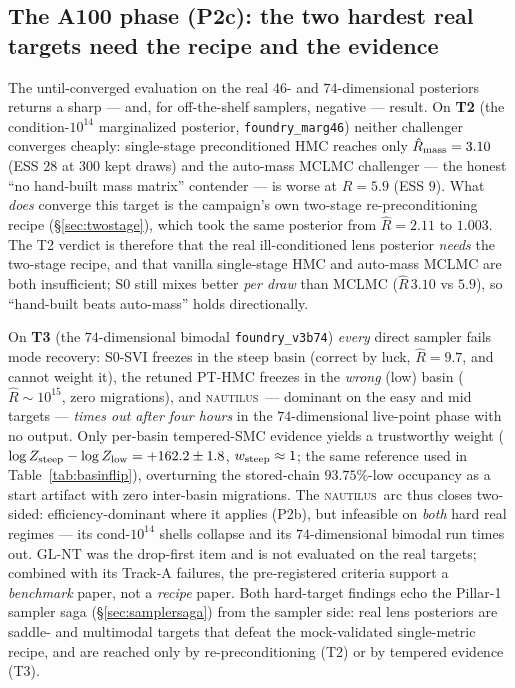 \documentclass[11pt,letterpaper]{article}
\newcommand{\Rhat}{\ensuremath{\hat{R}}}
\newcommand{\nautilus}{\textsc{nautilus}}
\newcommand{\dfile}[1]{\texttt{#1}}
\begin{document}
\subsection{The A100 phase (P2c): the two hardest real targets need the recipe
and the evidence}
\label{sec:p2c}

The until-converged evaluation on the real $46$- and $74$-dimensional posteriors
returns a sharp --- and, for off-the-shelf samplers, negative --- result. On
{\bf T2} (the condition-$10^{14}$ marginalized posterior, \dfile{foundry\_marg46})
neither challenger converges cheaply: single-stage preconditioned HMC reaches
only $\Rhat_{\rm mass}=3.10$ (ESS $28$ at $300$ kept draws) and the auto-mass
MCLMC challenger --- the honest ``no hand-built mass matrix'' contender --- is
worse at $\Rhat=5.9$ (ESS $9$). What {\it does} converge this target is the
campaign's own two-stage re-preconditioning recipe (\S\ref{sec:twostage}),
which took the same posterior from $\Rhat=2.11$ to $1.003$. The T2 verdict is
therefore that the real ill-conditioned lens posterior {\it needs} the two-stage
recipe, and that vanilla single-stage HMC and auto-mass MCLMC are both
insufficient; S0 still mixes better {\it per draw} than MCLMC
($\Rhat\,3.10$ vs $5.9$), so ``hand-built beats auto-mass'' holds directionally.

On {\bf T3} (the $74$-dimensional bimodal \dfile{foundry\_v3b74}) {\it every}
direct sampler fails mode recovery: S0-SVI freezes in the steep basin (correct
by luck, $\Rhat=9.7$, and cannot weight it), the retuned PT-HMC freezes in the
{\it wrong} (low) basin ($\Rhat\sim10^{15}$, zero migrations), and \nautilus\
--- dominant on the easy and mid targets --- {\it times out after four hours} in
the $74$-dimensional live-point phase with no output. Only per-basin tempered-SMC
evidence yields a trustworthy weight ($\log Z_{\rm steep}-\log Z_{\rm low}
=+162.2\pm1.8$, $w_{\rm steep}\approx1$; the same reference used in
Table~\ref{tab:basinflip}), overturning the stored-chain $93.75\%$-low occupancy
as a start artifact with zero inter-basin migrations. The \nautilus\ arc thus
closes two-sided: efficiency-dominant where it applies (P2b), but infeasible on
{\it both} hard real regimes --- its cond-$10^{14}$ shells collapse and its
$74$-dimensional bimodal run times out. GL-NT was the drop-first item and is not
evaluated on the real targets; combined with its Track-A failures, the
pre-registered criteria support a {\it benchmark} paper, not a {\it recipe}
paper. Both hard-target findings echo the Pillar-1 sampler saga
(\S\ref{sec:samplersaga}) from the sampler side: real lens posteriors are saddle-
and multimodal targets that defeat the mock-validated single-metric recipe, and
are reached only by re-preconditioning (T2) or by tempered evidence (T3).
\end{document}
